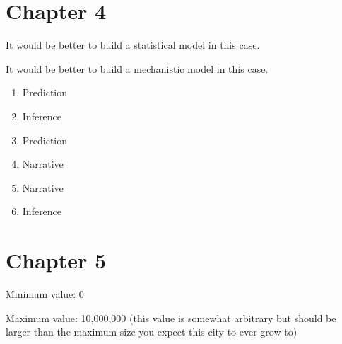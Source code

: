 \documentclass[]{memoir}
\begin{document}
\section{Chapter 4}


It would be better to build a statistical model in this case.


It would be better to build a mechanistic model in this case.


\begin{enumerate}
\def\labelenumi{\arabic{enumi}.}
\itemsep1pt\parskip0pt
\item
  Prediction
\item
  Inference
\item
  Prediction
\item
  Narrative
\item
  Narrative
\item
  Inference
\end{enumerate}

\section{Chapter 5}


Minimum value: 0

Maximum value: 10,000,000 (this value is somewhat arbitrary but should
be larger than the maximum size you expect this city to ever grow to)

\end{document}
